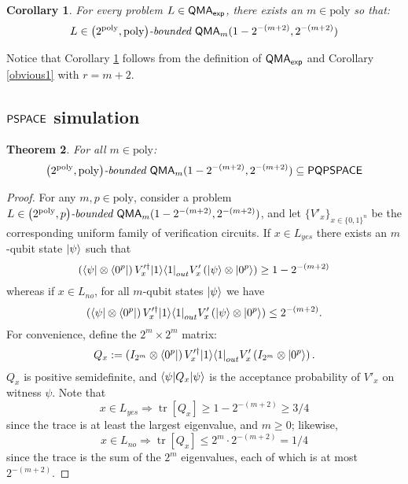 \documentclass[11pt]{article}
\newtheorem{theorem}{Theorem}
\newtheorem{corollary}[theorem]{Corollary}
\theoremstyle{definition}
\theoremstyle{remark}
\newcommand\QMA{{\sf{QMA}}}
\newcommand\PSPACE{{\sf{PSPACE}}}
\newcommand\QMAexp{{\sf{QMA}_{exp}}}
\newcommand\bddQMA[5]{{\left(#1,#2\right)}\textit{-bounded }\QMA_{#3}(#4,#5)}
\newcommand\PQPSPACE{{\sf{PQPSPACE}}}
\DeclareMathOperator{\tr}{tr}
\newcommand{\poly}{\textrm{poly}}
\begin{document}
\begin{corollary}\label{obvious2}For every problem $L\in\QMAexp$, there exists an $m \in \poly$ so that:
\[L\in\bddQMA{2^{\poly}}{\poly}{m}{1-2^{-(m+2)}}{2^{-(m+2)}}\]
\end{corollary}
Notice that Corollary \ref{obvious2} follows from the definition of $\QMAexp$ and Corollary \ref{obvious1} with $r=m+2$.
\subsection{$\PSPACE$ simulation}
\begin{theorem} \label{thm:pqpspace simulation}
For all $m\in\poly$:\[\bddQMA{2^{\poly}}{\poly}{m}{1-2^{-(m+2)}}{2^{-(m+2)}}\subseteq\PQPSPACE\]\end{theorem}
\begin{proof}
For any $m, p \in\poly$, consider a problem $L\in\bddQMA{2^{\poly}}{p}{m}{1-2^{-(m+2)}}{2^{-(m+2)}}$, and let $\{V'_x\}_{x\in\{0,1\}^n}$ be the corresponding uniform family of verification circuits.
If $x\in L_{yes}$ there exists an $m$-qubit state ${\left\vert{\psi}\right\rangle}$ such that
\begin{equation}
\left({\left\langle{\psi}\right\vert}\otimes {\left\langle{0^p}\right\vert}\right) V'^\dagger_x {\left\vert{1}\right\rangle}{\left\langle{1}\right\vert}_{out} V'_x \left({\left\vert{\psi}\right\rangle}\otimes {\left\vert{0^p}\right\rangle}\right) \ge 1-2^{-(m+2)}
\end{equation}
whereas if $x \in L_{no}$, for all $m$-qubit states ${\left\vert{\psi}\right\rangle}$ we have
\begin{equation}
\left({\left\langle{\psi}\right\vert}\otimes {\left\langle{0^p}\right\vert}\right) V'^\dagger_x {\left\vert{1}\right\rangle}{\left\langle{1}\right\vert}_{out} V'_x \left({\left\vert{\psi}\right\rangle}\otimes {\left\vert{0^p}\right\rangle}\right) \le 2^{-(m+2)}.
\end{equation}
For convenience, define the $2^m \times 2^m$ matrix:
\begin{equation}
Q_x := \left(I_{2^m}\otimes {\left\langle{0^p}\right\vert}\right) V'^\dagger_x {\left\vert{1}\right\rangle}{\left\langle{1}\right\vert}_{out} V'_x \left(I_{2^m}\otimes {\left\vert{0^p}\right\rangle}\right).
\end{equation}
$Q_x$ is positive semidefinite, and ${\left\langle{\psi}\right\vert}Q_x{\left\vert{\psi}\right\rangle}$ is the acceptance probability of $V'_x$ on witness $\psi$.
Note that
\begin{equation}
x\in L_{yes} \Rightarrow \tr[Q_x]\ge 1 - 2^{-(m+2)} \ge 3/4
\end{equation}
since the trace is at least the largest eigenvalue, and $m\geq 0$; likewise,
\begin{equation}
x\in L_{no} \Rightarrow \tr[Q_x]\le 2^m \cdot 2^{-(m+2)} = 1/4
\end{equation}
since the trace is the sum of the $2^m$ eigenvalues, each of which is at most $2^{-(m+2)}$. 


\end{proof}
\end{document}
